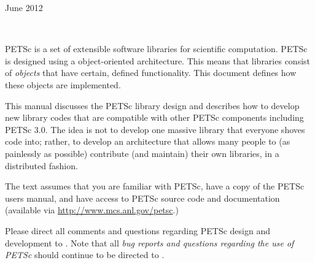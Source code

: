\documentclass[twoside,12pt]{../sty/report_petsc}
\begin{document}
{}{June 2012}

\newpage

\hbox{ }

\vspace{1in}
\date{\today}


\newpage



\medskip \medskip


%
%

\medskip \medskip
PETSc is 
a set of extensible software libraries for scientific computation.
PETSc is designed using a object-oriented
architecture. This means that libraries consist of {\em objects} that
have certain, defined functionality. This document defines how these
objects are implemented.

This manual discusses the PETSc library design and describes
how to develop new library codes that are compatible with other PETSc components 
including PETSc 3.0.
The idea is not to develop one massive library that everyone shoves code 
into; rather, to develop an architecture that allows many people
to (as painlessly as possible) contribute (and maintain) their own libraries,
in a distributed fashion.

The text assumes
that you are familiar with PETSc, have a copy of the PETSc users
manual, and have access to PETSc source code and documentation
(available via \href{http://www.mcs.anl.gov/petsc}{http://www.mcs.anl.gov/petsc}.)


\vspace{1cm}

Please direct all comments and questions regarding PETSc design and
development to .  Note that all {\em
bug reports and questions regarding the use of PETSc} should continue
to be directed to .

%
%
\end{document}
